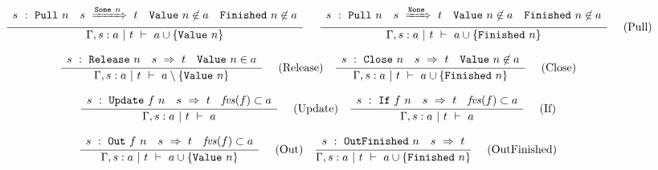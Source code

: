 
\begin{figure*}

$$
\frac {\displaystyle 
    \begin{array}{lccr}
        s ~:~ \mathtt{Pull}~n    &
        s ~\xRightarrow{\mathtt{Some}~n}~ t          &
        \mathtt{Value}~n \not\in a             &
        \mathtt{Finished}~n \not\in a
    \end{array}
} {\displaystyle  
     \Gamma, s : a  ~|~  t  ~\vdash~  a \cup \{ \mathtt{Value}~n \} 
} \ 
\quad
\frac {\displaystyle 
    \begin{array}{lccr}
        s ~:~ \mathtt{Pull}~n    &
        s ~\xRightarrow{\mathtt{None}}~ t          &
        \mathtt{Value}~n \not\in a             &
        \mathtt{Finished}~n \not\in a
    \end{array}
} {\displaystyle  
     \Gamma, s : a  ~|~  t  ~\vdash~  a \cup \{ \mathtt{Finished}~n \} 
} \ 
\quad
\textrm{(Pull)}
$$

$$
\frac {\displaystyle 
    \begin{array}{lcr}
        s ~:~ \mathtt{Release}~n    &
        s ~\Rightarrow~ t          &
        \mathtt{Value}~n \in a
    \end{array}
} {\displaystyle  
     \Gamma, s : a  ~|~  t  ~\vdash~  a \setminus \{ \mathtt{Value}~n \} 
} \ 
\quad
\textrm{(Release)}
\quad
\frac {\displaystyle 
    \begin{array}{lcr}
        s ~:~ \mathtt{Close}~n    &
        s ~\Rightarrow~ t          &
        \mathtt{Value}~n \not\in a
    \end{array}
} {\displaystyle  
     \Gamma, s : a  ~|~  t  ~\vdash~  a \cup \{ \mathtt{Finished}~n \} 
} \ 
\quad
\textrm{(Close)}
$$

$$
\frac {\displaystyle 
    \begin{array}{lcr}
        s ~:~ \mathtt{Update}~f~n    &
        s ~\Rightarrow~ t          &
        \mathit{fvs}(f) \subset a
    \end{array}
} {\displaystyle  
     \Gamma, s : a  ~|~  t  ~\vdash~  a 
} \ 
\quad
\textrm{(Update)}
\quad
\frac {\displaystyle 
    \begin{array}{lcr}
        s ~:~ \mathtt{If}~f~n    &
        s ~\Rightarrow~ t          &
        \mathit{fvs}(f) \subset a
    \end{array}
} {\displaystyle  
     \Gamma, s : a  ~|~  t  ~\vdash~  a 
} \ 
\quad
\textrm{(If)}
$$

$$
\frac {\displaystyle 
    \begin{array}{lcr}
        s ~:~ \mathtt{Out}~f~n    &
        s ~\Rightarrow~ t          &
        \mathit{fvs}(f) \subset a
    \end{array}
} {\displaystyle  
     \Gamma, s : a  ~|~  t  ~\vdash~  a \cup \{ \mathtt{Value}~n \} 
} \ 
\quad
\textrm{(Out)}
\quad
\frac {\displaystyle 
    \begin{array}{lr}
        s ~:~ \mathtt{OutFinished}~n    &
        s ~\Rightarrow~ t
    \end{array}
} {\displaystyle  
     \Gamma, s : a  ~|~  t  ~\vdash~  a \cup \{ \mathtt{Finished}~n \} 
} \ 
\quad
\textrm{(OutFinished)}
$$


\end{figure*}
